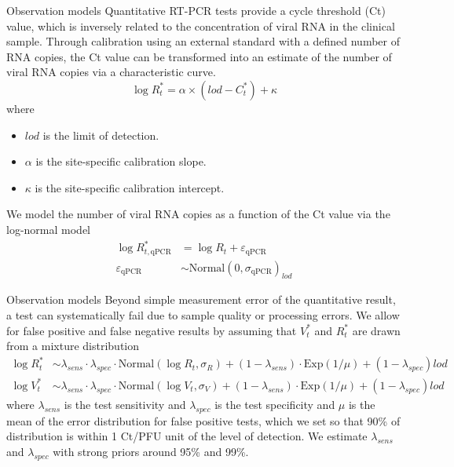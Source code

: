 \documentclass[9pt, aspectratio=169]{beamer}
\begin{document}
\begin{frame}{Observation models}
Quantitative RT-PCR tests provide a cycle threshold (Ct) value, which is inversely related to the concentration of viral RNA in the clinical sample. Through calibration using an external standard with a defined number of RNA copies, the Ct value can be transformed into an estimate of the number of viral RNA copies via a characteristic curve.
$$\log R^*_t = \alpha \times (lod - C_t^*) + \kappa$$
where 
\begin{itemize}
    \item $lod$ is the limit of detection.
    \item $\alpha$ is the site-specific calibration slope.
    \item $\kappa$ is the site-specific calibration intercept.
\end{itemize}
\vfill
We model the number of viral RNA copies as a function of the Ct value via the log-normal model
\begin{align*}
    \log R^{*}_{t,\text{qPCR}} &= \log R_t + \varepsilon_{\text{qPCR}} \\
    \varepsilon_{\text{qPCR}} &\sim \text{Normal}(0, \sigma_{\text{qPCR}})_{lod}
\end{align*}
\end{frame}

\begin{frame}{Observation models}
Beyond simple measurement error of the quantitative result, a test can systematically fail due to sample quality or processing errors. We allow for false positive and false negative results by assuming that $V^{*}_{t}$ and $R^{*}_{t}$ are drawn from a mixture distribution
\vfill
\begin{align*}
    \log R^{*}_{t} & \sim \lambda_{sens} \cdot \lambda_{spec} \cdot \text{Normal}(\log R_t, \sigma_{R}) + (1 - \lambda_{sens}) \cdot \text{Exp}(1/\mu) + (1 - \lambda_{spec}) lod \\
     \log V^{*}_{t} &\sim \lambda_{sens} \cdot \lambda_{spec} \cdot \text{Normal}(\log V_t, \sigma_{V}) + (1 - \lambda_{sens}) \cdot \text{Exp}(1/\mu) + (1 - \lambda_{spec}) lod
\end{align*}
\vfill
where $\lambda_{sens}$ is the test sensitivity and $\lambda_{spec}$ is the test specificity and $\mu$ is the mean of the error distribution for false positive tests, which we set so that 90\% of distribution is within 1 Ct/PFU unit of the level of detection. We estimate $\lambda_{sens}$ and $\lambda_{spec}$ with strong priors around 95\% and 99\%.
\end{frame}
\end{document}
